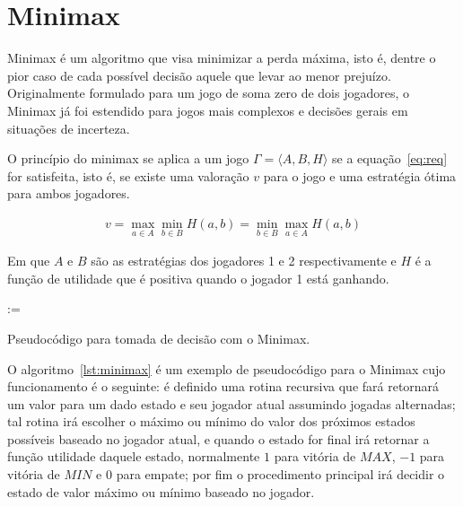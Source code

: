 \chapter{Minimax}\label{cap:minimax}

Minimax é um algoritmo que visa minimizar a perda máxima, isto é, dentre
o pior caso de cada possível decisão aquele que levar ao menor prejuízo.
Originalmente formulado para um jogo de soma zero de dois jogadores, o Minimax
já foi estendido para jogos mais complexos e decisões gerais em situações de
incerteza.

O princípio do minimax se aplica a um jogo $\Gamma=\langle A,B,H\rangle$ se a
equação~\ref{eq:req} for satisfeita, isto é, se existe uma valoração $v$ para o
jogo e uma estratégia ótima para ambos jogadores.
\cite{hazewinkel2002encyclopaedia}

\begin{gather}
  v=\max_{a\in A}\min_{b\in B}H(a,b)=\min_{b\in B}\max_{a\in A}H(a,b)\label{eq:req}
\end{gather}

Em que $A$ e $B$ são as estratégias dos jogadores 1 e 2 respectivamente e $H$ é a
função de utilidade que é positiva quando o jogador 1 está ganhando.

\begin{algorithm}


   := 

  \;

  \caption{Pseudocódigo para tomada de decisão com o Minimax.}\label{lst:minimax}
\end{algorithm}

O algoritmo~\ref{lst:minimax} é um exemplo de pseudocódigo para o Minimax cujo
funcionamento é o seguinte: é definido uma rotina recursiva que fará retornará
um valor para um dado estado e seu jogador atual assumindo jogadas alternadas;
tal rotina irá escolher o máximo ou mínimo do valor dos próximos estados
possíveis baseado no jogador atual, e quando o estado for final irá retornar a
função utilidade daquele estado, normalmente $1$ para vitória de $MAX$, $-1$
para vitória de $MIN$ e $0$ para empate; por fim o procedimento principal irá
decidir o estado de valor máximo ou mínimo baseado no jogador.


